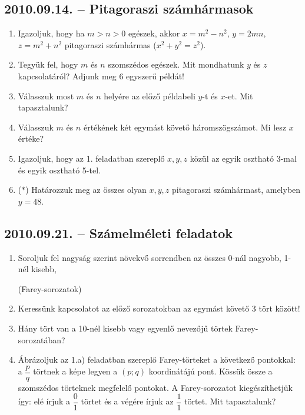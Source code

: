 \subsection*{2010.09.14. -- Pitagoraszi számhármasok}
\begin{enumerate}
\item Igazoljuk, hogy ha $m>n>0$ egészek, akkor
$x=m^2-n^2$, $y=2mn$, $z=m^2+n^2$ pitagoraszi számhármas ($x^2+y^2=z^2$).
\item Tegyük fel, hogy $m$ és $n$ szomszédos egészek. Mit mondhatunk $y$ és $z$
kapcsolatáról? Adjunk meg 6 egyszerű példát!
\item Válasszuk most $m$ és $n$ helyére az előző példabeli $y$-t és $x$-et. Mit tapasztalunk?
\item Válasszuk $m$ és $n$ értékének két egymást követő háromszögszámot. Mi lesz $x$ értéke?
\item Igazoljuk, hogy az 1. feladatban szereplő $x,y,z$ közül az egyik osztható 3-mal és egyik osztható 5-tel.
\item ($*$) Határozzuk meg az összes olyan $x,y,z$ pitagoraszi számhármast, amelyben $y=48$.
\end{enumerate}

\subsection*{2010.09.21. -- Számelméleti feladatok}
\begin{enumerate}
\item Soroljuk fel nagyság szerint növekvő sorrendben az összes 0-nál nagyobb,
1-nél kisebb,
\noindent (Farey-sorozatok)
\item Keressünk kapcsolatot az előző sorozatokban az egymást követő 3 tört között!
\item Hány tört van a 10-nél kisebb vagy egyenlő nevezőjű törtek Farey-sorozatában?
\item Ábrázoljuk az 1.a) feladatban szereplő Farey-törteket a következő pontokkal:
a $\dfrac{p}{q}$ törtnek a képe legyen a $(p;q)$ koordinátájú pont. Kössük össze a 
szomszédos törteknek megfelelő pontokat. A Farey-sorozatot kiegészíthetjük így: elé írjuk a $\dfrac{0}{1}$ törtet és a végére írjuk az $\dfrac{1}{1}$ törtet. Mit tapasztalunk?
\end{enumerate}



